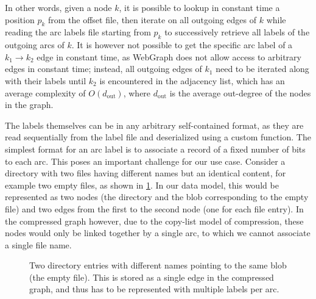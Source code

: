 In other words, given a node $k$, it is possible to lookup in constant time
a position $p_k$ from the offset file, then iterate on all outgoing edges
of $k$ while reading the arc labels file starting from $p_k$ to
successively retrieve all labels of the outgoing arcs of $k$. It is however not
possible to get the specific arc label of a $k_1 \to k_2$ edge in constant
time, as WebGraph does not allow access to arbitrary edges in constant time;
instead, all outgoing edges of $k_1$ need to be iterated along with their
labels until $k_2$ is encountered in the adjacency list, which has an average
complexity of $O(d_{\mathrm{out}})$, where $d_{\mathrm{out}}$ is the average
out-degree of the nodes in the graph.


The labels themselves can be in any arbitrary self-contained format, as they
are read sequentially from the label file and deserialized using a custom
function. The simplest format for an arc label is to associate a record of a
fixed number of bits to each arc. This poses an important challenge for
our use case. Consider a directory with two files having different names but
an identical content, for example two empty files, as shown in
\cref{fig:multiple-labels}. In our data model, this would be represented as two
nodes (the directory and the blob corresponding to the empty file) and two
edges from the first to the second node (one for each file entry). In the
compressed graph however, due to the copy-list model of compression, these
nodes would only be linked together by a single arc, to which we cannot
associate a single file name.

\begin{figure}
    \centering
    \caption{Two directory entries with different names pointing to the same
    blob (the empty file). This is stored as a single edge in the compressed
    graph, and thus has to be represented with multiple labels per arc.}%
    \label{fig:multiple-labels}
\end{figure}

